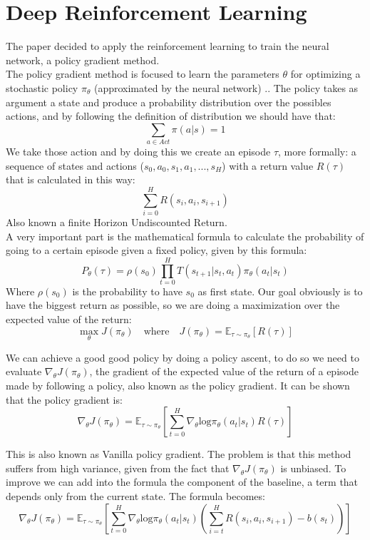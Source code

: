 \documentclass[12pt]{book}
\begin{document}
\section{Deep Reinforcement Learning}
The paper decided to apply the reinforcement learning to train the neural network, a policy gradient method.\\
The policy gradient method is focused to learn the parameters $\theta$ for optimizing a stochastic policy $\pi_\theta$ (approximated by the neural network) \cite{williams1992simple}.. The policy takes as argument a state and produce a probability distribution over the possibles actions, and by following the definition of distribution we should have that: \[ \sum_{a\in Act} \pi(a|s) = 1 \]
We take those action and by doing this we create an episode $\tau$, more formally: a sequence of states and actions ($s_0, a_0, s_1, a_1,...,s_H$) with a return value $R(\tau)$ that is calculated in this way:
\[ \sum_{i=0}^{H} R(s_i, a_i, s_{i+1})\]
Also known a finite Horizon Undiscounted Return.\\
A very important part is the mathematical formula to calculate the probability of going to a certain episode given a fixed policy, given by this formula:
\[P_\theta(\tau) = \rho(s_0)\prod_{t=0}^{H}T(s_{t+1}|s_t, a_t)\pi_\theta(a_t|s_t)\]
Where $\rho(s_0)$ is the probability to have $s_0$ as first state.
Our goal obviously is to have the biggest return as possible, so we are doing a maximization over the expected value of the return:
\[\max_\theta J(\pi_\theta)\quad \textrm{where}\quad J(\pi_\theta) = \mathbb{E}_{\tau \sim \pi_\theta}\left[R(\tau) \right]\]

We can achieve a good good policy by doing a policy ascent, to do so we need to evaluate $\nabla_\theta J(\pi_\theta)$, the gradient of the expected value of the return of a episode made by following a policy, also known as the policy gradient. It can be shown that the policy gradient is:
\[\nabla_\theta J(\pi_\theta) = \mathbb{E}_{\tau \sim \pi_\theta}\left[\sum_{t=0}^{H}\nabla_\theta \textrm{log}\pi_\theta(a_t|s_t)R(\tau)\right]\]

This is also known as Vanilla policy gradient.
The problem is that this method suffers from high variance, given from the fact that $\nabla_\theta J(\pi_\theta)$ is unbiased. To improve we can add into the formula the component of the baseline, a term that depends only from the current state. The formula becomes:
\[\nabla_\theta J(\pi_\theta) = \mathbb{E}_{\tau \sim \pi_\theta}\left[\sum_{t=0}^{H}\nabla_\theta \textrm{log}\pi_\theta(a_t|s_t)\left(\sum_{i=t}^{H}R(s_i, a_i, s_{i+1}) - b(s_t)\right)\right]\]
\end{document}
